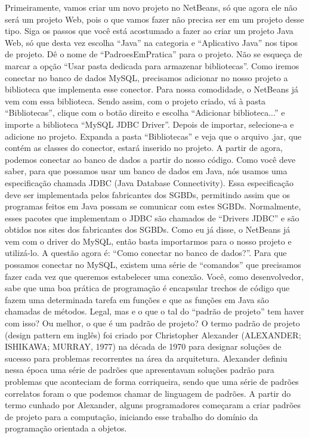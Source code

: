 Primeiramente, vamos criar um novo projeto no NetBeans, só que agora ele não será um projeto Web, pois o que vamos fazer não precisa ser em um projeto desse tipo. Siga os passos que você está acostumado a fazer ao criar um projeto Java Web, só que desta vez escolha “Java” na categoria e “Aplicativo Java” nos tipos de projeto. Dê o nome de “PadroesEmPratica” para o projeto. Não se esqueça de marcar a opção “Usar pasta dedicada para armazenar bibliotecas”.
Como iremos conectar no banco de dados MySQL, precisamos adicionar no nosso projeto a biblioteca que implementa esse conector. Para nossa comodidade, o NetBeans já vem com essa biblioteca. Sendo assim, com o projeto criado, vá à pasta “Bibliotecas”, clique com o botão direito e escolha “Adicionar biblioteca...” e importe a biblioteca “MySQL JDBC Driver”. Depois de importar, selecione-a e adicione no projeto. Expanda a pasta “Bibliotecas” e veja que o arquivo .jar, que contém as classes do conector, estará inserido no projeto.
A partir de agora, podemos conectar ao banco de dados a partir do nosso código. Como você deve saber, para que possamos usar um banco de dados em Java, nós usamos uma especificação chamada JDBC (Java Database Connectivity). Essa especificação deve ser implementada pelos fabricantes dos SGBDs, permitindo assim que os programas feitos em Java possam se comunicar com estes SGBDs. Normalmente, esses pacotes que implementam o JDBC são chamados de “Drivers JDBC” e são obtidos nos sites dos fabricantes dos SGBDs. Como eu já disse, o NetBeans já vem com o driver do MySQL, então basta importarmos para o nosso projeto e utilizá-lo.
A questão agora é: “Como conectar no banco de dados?”. Para que possamos conectar no MySQL, existem uma série de “comandos” que precisamos fazer cada vez que queremos estabelecer uma conexão. Você, como desenvolvedor, sabe que uma boa prática de programação é encapsular trechos de código que fazem uma determinada tarefa em funções e que as funções em Java são chamadas de métodos.
Legal, mas e o que o tal do “padrão de projeto” tem haver com isso? Ou melhor, o que é um padrão de projeto? O termo padrão de projeto (design pattern em inglês) foi criado por Christopher Alexander (ALEXANDER; ISHIKAWA; MURRAY, 1977) na década de 1970 para designar soluções de sucesso para problemas recorrentes na área da arquitetura. Alexander definiu nessa época uma série de padrões que apresentavam soluções padrão para problemas que aconteciam de forma corriqueira, sendo que uma série de padrões correlatos foram o que podemos chamar de linguagem de padrões. A partir do termo cunhado por Alexander, alguns programadores começaram a criar padrões de projeto para a computação, iniciando esse trabalho do domínio da programação orientada a objetos.
